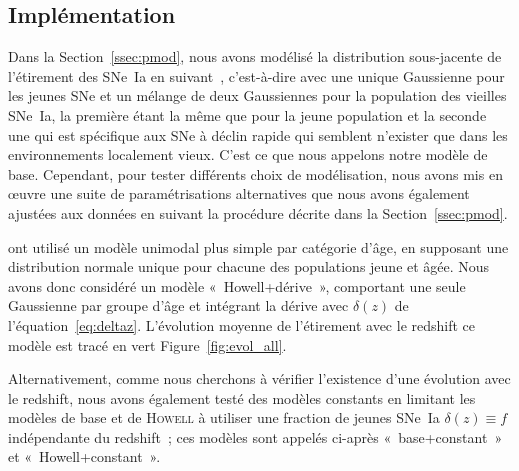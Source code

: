 \documentclass[../main/main.tex]{subfiles}
\begin{document}
\subsection{Implémentation}\label{ssec:modimpl}

Dans la Section~\ref{ssec:pmod}, nous avons modélisé la distribution
sous-jacente de l'étirement des SNe~Ia en suivant~\cite{rigault2020},
c'est-à-dire avec une unique Gaussienne pour les jeunes SNe et un mélange de
deux Gaussiennes pour la population des vieilles SNe~Ia, la première étant la
même que pour la jeune population et la seconde une qui est spécifique aux SNe à
déclin rapide qui semblent n'exister que dans les environnements localement
vieux. C'est ce que nous appelons notre modèle de base. Cependant, pour
tester différents choix de modélisation, nous avons mis en œuvre une suite de
paramétrisations alternatives que nous avons également ajustées aux données en
suivant la procédure décrite dans la Section~\ref{ssec:pmod}.

\cite{howell2007} ont utilisé un modèle unimodal plus simple par catégorie
d'âge, en supposant une distribution normale unique pour chacune des populations
jeune et âgée. Nous avons donc considéré un modèle «~Howell+dérive~», comportant
une seule Gaussienne par groupe d'âge et intégrant la dérive avec $\delta(z)$ de
l'équation~\ref{eq:deltaz}. L'évolution moyenne de l'étirement avec le redshift
ce modèle est tracé en vert Figure~\ref{fig:evol_all}.

Alternativement, comme nous cherchons à vérifier l'existence d'une évolution
avec le redshift, nous avons également testé des modèles constants en limitant
les modèles de base et de \textsc{Howell} à utiliser une fraction de jeunes
SNe~Ia $\delta(z) \equiv f$ indépendante du redshift~; ces modèles sont appelés
ci-après «~base+constant~» et «~Howell+constant~».
\end{document}
